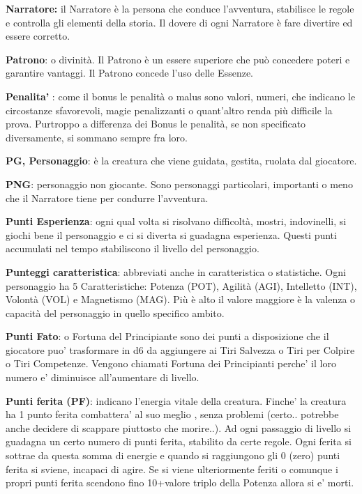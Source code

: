 \documentclass[a4paper,11pt,twoside,openany]{book}
\begin{document}
\textbf{Narratore:} il Narratore è la persona che conduce l'avventura, stabilisce le regole e controlla gli elementi della storia. Il dovere di ogni Narratore è fare divertire ed essere corretto.

\textbf{Patrono}: o divinità. Il Patrono è un essere superiore che può concedere poteri e garantire vantaggi. Il Patrono concede l'uso delle Essenze.

\textbf{Penalita'} : come il bonus le penalità o malus sono valori, numeri, che indicano le circostanze sfavorevoli, magie penalizzanti o quant'altro renda più difficile la prova. Purtroppo a differenza dei Bonus le penalità, se non specificato diversamente, si sommano sempre fra loro.

\textbf{PG, Personaggio}: è la creatura che viene guidata, gestita, ruolata dal giocatore.

\textbf{PNG}: personaggio non giocante. Sono personaggi particolari, importanti o meno che il Narratore tiene per condurre l'avventura.

\textbf{Punti Esperienza}:   ogni qual volta si risolvano difficoltà, mostri, indovinelli, si giochi bene il personaggio e ci si diverta si guadagna esperienza. Questi punti accumulati nel tempo stabiliscono il livello del personaggio.

\textbf{Punteggi caratteristica}:   abbreviati anche in caratteristica o statistiche. Ogni personaggio ha 5 Caratteristiche: Potenza (POT), Agilità (AGI), Intelletto (INT), Volontà (VOL) e Magnetismo (MAG). Più è alto il valore maggiore è la valenza o capacità del personaggio in quello specifico ambito.

\textbf{Punti Fato}: o Fortuna del Principiante sono dei punti a disposizione che il giocatore puo’ trasformare in d6 da aggiungere ai Tiri Salvezza o Tiri per Colpire o Tiri Competenze. Vengono chiamati Fortuna dei Principianti perche’ il loro numero e’ diminuisce all’aumentare di livello.

\textbf{Punti ferita (PF)}: indicano l’energia vitale della creatura. Finche’ la creatura ha 1 punto ferita combattera’ al suo meglio , senza problemi (certo.. potrebbe anche decidere di scappare piuttosto che morire..).
Ad ogni passaggio di livello si guadagna un certo numero di punti ferita, stabilito da certe regole. Ogni ferita si sottrae da questa somma di energie e quando si raggiungono gli 0 (zero) punti ferita si sviene, incapaci di agire. Se si viene ulteriormente feriti o comunque i propri punti ferita scendono fino 10+valore triplo della Potenza allora si e’ morti.
\end{document}
